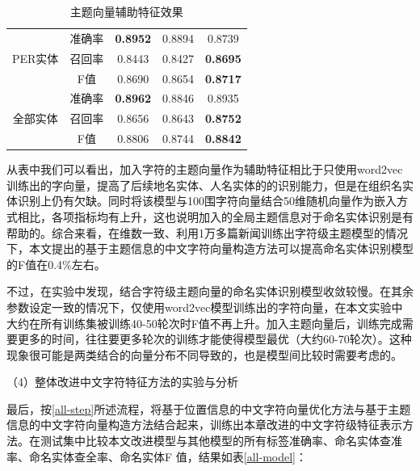 \documentclass[winfonts,master,oneside,nobackinfo]{njuthesis}
\begin{document}
\begin{table}[h]
\begin{tabular}{|c|c|c|c|c|}
\multirow{3}{*}{PER实体} & 准确率 & \textbf{0.8952}  & 0.8894                                                    & 0.8739                                                    \\ \cline{2-5} 
                       & 召回率 & 0.8443  & 0.8427                                                    & \textbf{0.8695}                                                    \\ \cline{2-5} 
                       & F值  & 0.8690  & 0.8654                                                    & \textbf{0.8717}                                                    \\ \hline
\multirow{3}{*}{全部实体}  & 准确率 & \textbf{0.8962}  & 0.8846                                                    & 0.8935                                                    \\ \cline{2-5} 
                       & 召回率 & 0.8656  & 0.8643                                                    & \textbf{0.8752}                                                    \\ \cline{2-5} 
                       & F值  & 0.8806  & 0.8744                                                    & \textbf{0.8842}                                                    \\ \hline
\end{tabular}
\caption{主题向量辅助特征效果}
\label{exp-topic}
\end{table}

从表中我们可以看出，加入字符的主题向量作为辅助特征相比于只使用word2vec训练出的字向量，提高了后续地名实体、人名实体的的识别能力，但是在组织名实体识别上仍有欠缺。同时将该模型与100围字符向量结合50维随机向量作为嵌入方式相比，各项指标均有上升，这也说明加入的全局主题信息对于命名实体识别是有帮助的。综合来看，在维数一致、利用1万多篇新闻训练出字符级主题模型的情况下，本文提出的基于主题信息的中文字符向量构造方法可以提高命名实体识别模型的F值在0.4\%左右。

不过，在实验中发现，结合字符级主题向量的命名实体识别模型收敛较慢。在其余参数设定一致的情况下，仅使用word2vec模型训练出的字符向量，在本文实验中大约在所有训练集被训练40-50轮次时F值不再上升。加入主题向量后，训练完成需要更多的时间，往往要更多轮次的训练才能使得模型最优（大约60-70轮次）。这种现象很可能是两类结合的向量分布不同导致的，也是模型间比较时需要考虑的。

（4）整体改进中文字符特征方法的实验与分析

最后，按\ref{all-step}所述流程，将基于位置信息的中文字符向量优化方法与基于主题信息的中文字符向量构造方法结合起来，训练出本章改进的中文字符级特征表示方法。在测试集中比较本文改进模型与其他模型的所有标签准确率、命名实体查准率、命名实体查全率、命名实体F
值，结果如表\ref{all-model}：
\end{document}
